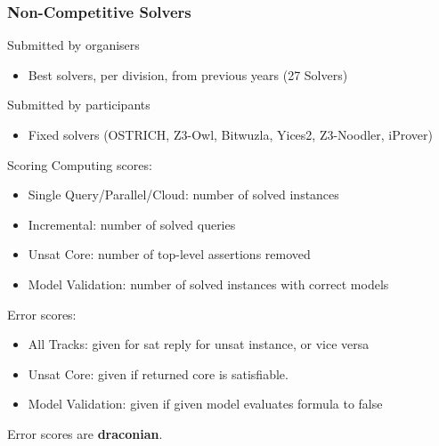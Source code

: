\documentclass[table]{beamer}
\def\emph#1{\textcolor{MYblue}{#1}}
\begin{document}
\begin{frame}
  \frametitle{Non-Competitive Solvers}

  Submitted by organisers
  \begin{itemize}
  \item Best solvers, per division, from previous years (27 Solvers)
  \end{itemize}
  \bigskip

  Submitted by participants
  \begin{itemize}
  \item Fixed solvers (OSTRICH, Z3-Owl, Bitwuzla, Yices2, Z3-Noodler, iProver)
  \end{itemize}
\end{frame}

\begin{frame}{Scoring}
  Computing scores:
  \begin{itemize}
  \item \emph{Single Query/Parallel/Cloud}: number of solved \emph{instances}
  \item \emph{Incremental}: number of solved \emph{queries}
  \item \emph{Unsat Core}: number of top-level assertions \emph{removed}
  \item \emph{Model Validation}: number of solved instances with correct \emph{models}
  \end{itemize}

  \bigskip
  Error scores:
  \begin{itemize}
  \item \emph{All Tracks}: given for sat reply for unsat instance, or vice versa
  \item \emph{Unsat Core}: given if returned core is satisfiable.
  \item \emph{Model Validation}: given if given model evaluates formula to \emph{false}
  \end{itemize}
  Error scores are \textbf{draconian}.
\end{frame}
\end{document}
